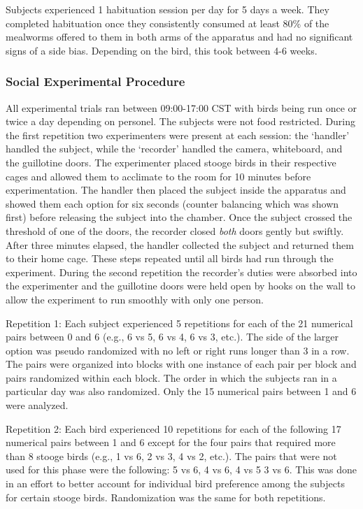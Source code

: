 \documentclass[
]{article}
\begin{document}
Subjects experienced 1 habituation session per day for 5 days a week.
They completed habituation once they consistently consumed at least 80\%
of the mealworms offered to them in both arms of the apparatus and had
no significant signs of a side bias. Depending on the bird, this took
between 4-6 weeks.

\hypertarget{social-experimental-procedure}{%
\subsubsection{Social Experimental
Procedure}\label{social-experimental-procedure}}

All experimental trials ran between 09:00-17:00 CST with birds being run
once or twice a day depending on personel. The subjects were not food
restricted. During the first repetition two experimenters were present
at each session: the `handler' handled the subject, while the `recorder'
handled the camera, whiteboard, and the guillotine doors. The
experimenter placed stooge birds in their respective cages and allowed
them to acclimate to the room for 10 minutes before experimentation. The
handler then placed the subject inside the apparatus and showed them
each option for six seconds (counter balancing which was shown first)
before releasing the subject into the chamber. Once the subject crossed
the threshold of one of the doors, the recorder closed \emph{both} doors
gently but swiftly. After three minutes elapsed, the handler collected
the subject and returned them to their home cage. These steps repeated
until all birds had run through the experiment. During the second
repetition the recorder's duties were absorbed into the experimenter and
the guillotine doors were held open by hooks on the wall to allow the
experiment to run smoothly with only one person.

Repetition 1: Each subject experienced 5 repetitions for each of the 21
numerical pairs between 0 and 6 (e.g., 6 vs 5, 6 vs 4, 6 vs 3, etc.).
The side of the larger option was pseudo randomized with no left or
right runs longer than 3 in a row. The pairs were organized into blocks
with one instance of each pair per block and pairs randomized within
each block. The order in which the subjects ran in a particular day was
also randomized. Only the 15 numerical pairs between 1 and 6 were
analyzed.

Repetition 2: Each bird experienced 10 repetitions for each of the
following 17 numerical pairs between 1 and 6 except for the four pairs
that required more than 8 stooge birds (e.g., 1 vs 6, 2 vs 3, 4 vs 2,
etc.). The pairs that were not used for this phase were the following: 5
vs 6, 4 vs 6, 4 vs 5 3 vs 6. This was done in an effort to better
account for individual bird preference among the subjects for certain
stooge birds. Randomization was the same for both repetitions.
\end{document}
